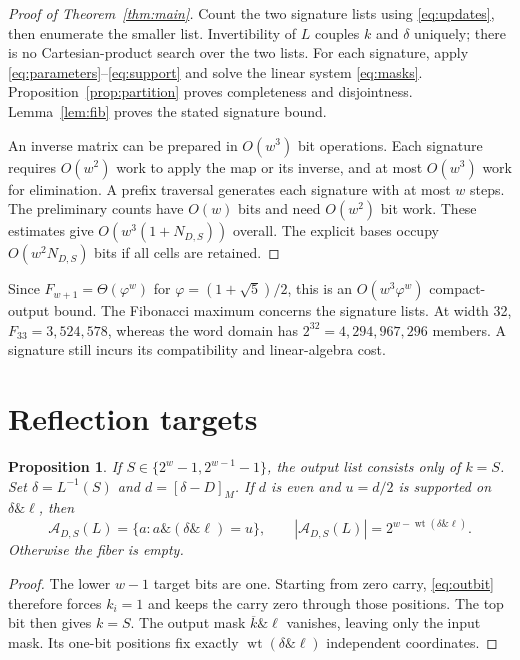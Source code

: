 \documentclass[11pt,a4paper]{article}
\newtheorem{proposition}[theorem]{Proposition}
\theoremstyle{definition}\newtheorem{definition}[theorem]{Definition}
\newcommand{\andb}{\mathbin{\&}}
\newcommand{\res}[1]{[#1]_M}
\DeclareMathOperator{\wt}{wt}
\begin{document}
\begin{proof}[Proof of Theorem~\ref{thm:main}]
Count the two signature lists using \eqref{eq:updates}, then enumerate
the smaller list. Invertibility of $L$ couples $k$ and $\delta$ uniquely;
there is no Cartesian-product search over the two lists. For each
signature, apply \eqref{eq:parameters}--\eqref{eq:support} and solve the
linear system \eqref{eq:masks}. Proposition~\ref{prop:partition} proves
completeness and disjointness. Lemma~\ref{lem:fib} proves the stated
signature bound.

An inverse matrix can be prepared in $O(w^3)$ bit operations. Each
signature requires $O(w^2)$ work to apply the map or its inverse, and at
most $O(w^3)$ work for elimination. A prefix traversal generates each
signature with at most $w$ steps. The preliminary counts have $O(w)$
bits and need $O(w^2)$ bit work. These estimates give
$O(w^3(1+N_{D,S}))$ overall. The explicit bases occupy
$O(w^2N_{D,S})$ bits if all cells are retained.
\end{proof}

Since $F_{w+1}=\Theta(\varphi^w)$ for
$\varphi=(1+\sqrt5)/2$, this is an $O(w^3\varphi^w)$ compact-output
bound. The Fibonacci maximum concerns the signature lists. At width 32, $F_{33}=3{,}524{,}578$, whereas the word
domain has $2^{32}=4{,}294{,}967{,}296$ members. A signature still incurs
its compatibility and linear-algebra cost.

\section{Reflection targets}
\begin{proposition}\label{prop:reflection}
If $S\in\{2^w-1,2^{w-1}-1\}$, the output list consists only of $k=S$.
Set $\delta=L^{-1}(S)$ and $d=\res{\delta-D}$. If $d$ is even and
$u=d/2$ is supported on $\delta\andb\ell$, then
\begin{equation}\label{eq:reflection}
\mathcal A_{D,S}(L)=\{a:a\andb(\delta\andb\ell)=u\},
\qquad |\mathcal A_{D,S}(L)|=2^{w-\wt(\delta\andb\ell)}.
\end{equation}
Otherwise the fiber is empty.
\end{proposition}
\begin{proof}
The lower $w-1$ target bits are one. Starting from zero carry,
\eqref{eq:outbit} therefore forces $k_i=1$ and keeps the carry zero
through those positions. The top bit then gives $k=S$. The output
mask $\overline{k}\andb\ell$ vanishes, leaving only the input mask.
Its one-bit positions fix exactly $\wt(\delta\andb\ell)$ independent
coordinates.
\end{proof}
\end{document}
